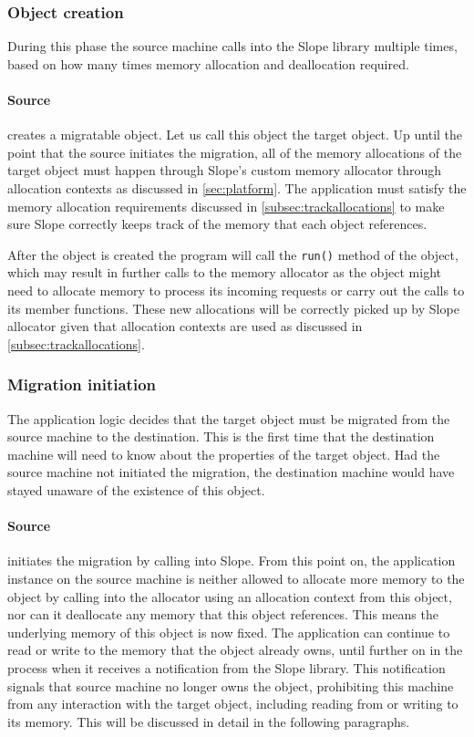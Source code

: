 \subsubsection{Object creation}
During this phase the source machine calls into the Slope library multiple
times, based on how many times memory allocation and deallocation required.

\paragraph{Source} creates a migratable object. Let us call this object
the target object. Up until the point that
the source initiates the migration, all of the memory allocations of the target object
must happen through
Slope's custom memory allocator through allocation contexts as discussed in
 \ref{sec:platform}.
The application must satisfy the memory allocation requirements discussed in
\ref{subsec:trackallocations} to make sure Slope correctly keeps track of the
memory that each object references. 

After the object is created the program will call the \texttt{run()} method
of the object, which may result in further calls to the memory allocator as
the object might need to allocate memory to process its incoming requests or
carry out the calls to its member functions. These new allocations will be
correctly picked up by Slope allocator given that allocation contexts are used
as discussed in \ref{subsec:trackallocations}. 

\subsubsection{Migration initiation}
The application logic decides that the target object must be migrated from the
source machine to the destination. This is the first time that the destination
machine will need to know about the properties of the target object. Had the
source machine not initiated the migration, the destination machine would have
stayed unaware of the existence of this object.

\paragraph{Source}
initiates the migration by calling into Slope. From this point
on, the application instance on the source machine is neither allowed to
allocate more memory to the object by calling into the allocator using
an allocation context from this object, nor can it deallocate any memory that
this object references. This means the underlying memory of this object is now
fixed. The application can continue to read or write to the memory that the
object already owns, until further on in the process when it receives a
notification from the Slope library. This notification signals that source
machine no longer owns the object, prohibiting this machine from any
interaction with the target object, including reading from or writing to its
memory. This will be discussed in detail in the following paragraphs.

